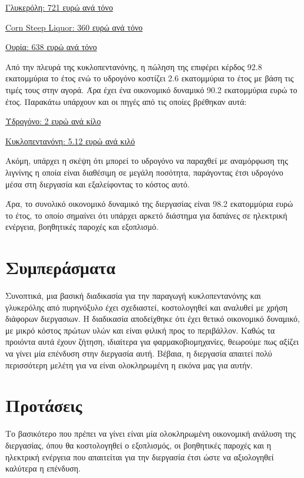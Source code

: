 \documentclass[11pt]{article}
\begin{document}
\href{https://www.selinawamucii.com/insights/prices/united-states-of-america/glycerol/}{Γλυκερόλη: 721 ευρώ ανά τόνο}

\href{https://www.indiamart.com/proddetail/corn-steep-liquor-15744963191.html}{Corn Steep Liquor: 360 ευρώ ανά τόνο}

\href{https://tradingeconomics.com/commodity/urea}{Ουρία: 638 ευρώ ανά τόνο}

Από την πλευρά της κυκλοπεντανόνης, η πώληση της επιφέρει κέρδος 92.8 εκατομμύρια το έτος ενώ το υδρογόνο κοστίζει 2.6 εκατομμύρια το έτος με βάση τις τιμές τους στην αγορά. Άρα έχει ένα οικονομικό δυναμικό 90.2 εκατομμύρια ευρώ το έτος. Παρακάτω υπάρχουν και οι πηγές από τις οποίες βρέθηκαν αυτά:

\href{https://www.sgh2energy.com/economics}{Υδρογόνο: 2 ευρώ ανά κίλο}

\href{https://dir.indiamart.com/impcat/cyclopentanone.html}{Κυκλοπεντανόνη: 5.12 ευρώ ανά κιλό}

Ακόμη, υπάρχει η σκέψη ότι μπορεί το υδρογόνο να παραχθεί με αναμόρφωση της λιγνίνης η οποία είναι διαθέσιμη σε μεγάλη ποσότητα, παράγοντας έτσι υδρογόνο μέσα στη διεργασία και εξαλείφοντας το κόστος αυτό. 

Άρα, το συνολικό οικονομικό δυναμικό της διεργασίας είναι 98.2 εκατομμύρια ευρώ το έτος, το οποίο σημαίνει ότι υπάρχει αρκετό διάστημα για δαπάνες σε ηλεκτρική ενέργεια, βοηθητικές παροχές και εξοπλισμό.

\section{Συμπεράσματα}
\label{sec:orgc518d30}
Συνοπτικά, μια βασική διαδικασία για την παραγωγή κυκλοπεντανόνης και γλυκερόλης από πυρηνόξυλο έχει σχεδιαστεί, κοστολογηθεί και αναλυθεί με χρήση διάφορων διεργασιων. Η διαδικασία αποδείχθηκε ότι έχει θετικό οικονομικό δυναμικό, με μικρό κόστος πρώτων υλών και είναι φιλική προς το περιβάλλον. Καθώς τα προιόντα αυτά έχουν ζήτηση, ιδιαίτερα για φαρμακοβιομηχανίες, θεωρούμε πως αξίζει να γίνει μία επένδυση στην διεργασία αυτή. Βέβαια, η διεργασία απαιτεί πολύ περισσότερη μελέτη για να είναι ολοκληρωμένη η εικόνα μας για αυτήν.

\section{Προτάσεις}
\label{sec:org52926c2}
Το βασικότερο που πρέπει να γίνει είναι μία ολοκληρωμένη οικονομική ανάλυση της διεργασίας, όπου θα κοστολογηθεί ο εξοπλισμός, οι βοηθητικές παροχές και η ηλεκτρική ενέργεια που απαιτείται για την διεργασία έτσι ώστε να αξιολογηθεί καλύτερα η επένδυση.
\end{document}
